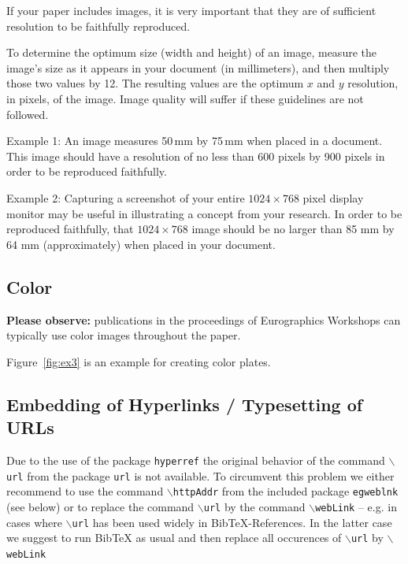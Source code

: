 \documentclass{egpubl-eurovis-short}
\begin{document}
If your paper includes images, it is very important that they are of
sufficient resolution to be faithfully reproduced.

To determine the optimum size (width and height) of an image, measure
the image's size as it appears in your document (in millimeters), and
then multiply those two values by 12. The resulting values are the
optimum $x$ and $y$ resolution, in pixels, of the image. Image quality
will suffer if these guidelines are not followed.

Example 1: 
%
An image measures 50\,mm by 75\,mm when placed in a document. This
image should have a resolution of no less than 600 pixels by 900
pixels in order to be reproduced faithfully.

Example 2: 
%
Capturing a screenshot of your entire $1024 \times 768$ pixel display
monitor may be useful in illustrating a concept from your research. In
order to be reproduced faithfully, that $1024 \times 768$ image should
be no larger than 85 mm by 64 mm (approximately) when placed in your
document.


\subsection{Color}

\textbf{Please observe:} publications in the proceedings of 
Eurographics Workshops can typically use color images throughout the paper. 

Figure~\ref{fig:ex3} is an example for creating color plates.

\subsection{Embedding of Hyperlinks / Typesetting of URLs}

Due to the use of the package \texttt{hyperref} the original behavior
of the command $\backslash$\texttt{url} from the package \texttt{url}
is not available. To circumvent this problem we either recommend to
use the command $\backslash$\texttt{httpAddr} from the 
included package \texttt{egweblnk} (see below) or to replace the
command $\backslash$\texttt{url} by the command $\backslash$\texttt{webLink} 
-- e.g. in cases where $\backslash$\texttt{url} has been used
widely in BibTeX-References. In the latter case we suggest to run
BibTeX as usual and then replace all occurences of $\backslash$\texttt{url}  by
$\backslash$\texttt{webLink}
\end{document}
